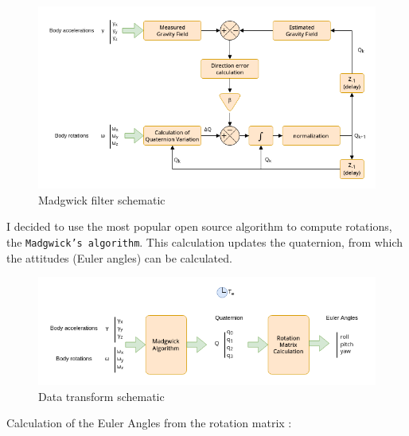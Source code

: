 \begin{figure}[H]
    \centering
    \includegraphics[width=0.9\linewidth]{./projects/pmodnav/madgwick.png}
    \caption{Madgwick filter schematic}
\end{figure}
I decided to use the most popular open source algorithm to compute rotations, the \texttt{Madgwick's algorithm}\cite{Madgwick}. This calculation updates the quaternion, from which the attitudes (Euler angles) can be calculated.
\begin{figure}[H]
    \centering
    \includegraphics[width=0.9\linewidth]{./projects/pmodnav/madgwick_applied.png}
    \caption{Data transform schematic}
\end{figure}

Calculation of the Euler Angles from the rotation matrix :


